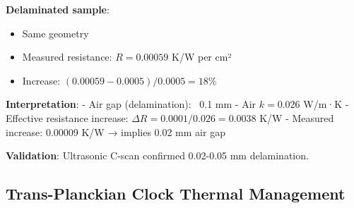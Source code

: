 \documentclass[12pt,a4paper]{article}
\begin{document}
\textbf{Delaminated sample}:
\begin{itemize}
\item Same geometry
\item Measured resistance: $R = 0.00059$ K/W per cm²
\item Increase: $(0.00059-0.0005)/0.0005 = 18\%$
\end{itemize}

\textbf{Interpretation}:
- Air gap (delamination): ~0.1 mm
- Air $k = 0.026$ W/m·K
- Effective resistance increase: $\Delta R = 0.0001/0.026 = 0.0038$ K/W
- Measured increase: 0.00009 K/W → implies 0.02 mm air gap

\textbf{Validation}: Ultrasonic C-scan confirmed 0.02-0.05 mm delamination.

\subsection{Trans-Planckian Clock Thermal Management}
\end{document}
